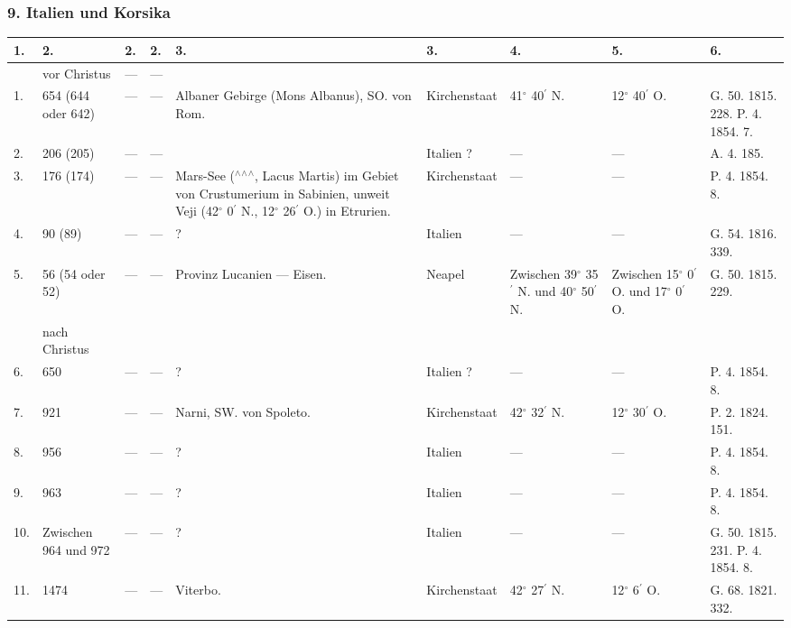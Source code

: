 \documentclass[a4paper, 8pt, oneside, polutonikogreek, german]{article}
\begin{document}
\subsubsection{9. Italien und Korsika}
\begin{center}
    \footnotesize
    \begin{longtable}{|p{3mm}|p{13mm}|p{5mm}|p{16mm}|p{25mm}|p{18mm}|p{13mm}|p{13mm}|p{13mm}|}
    \hline
        1. & 2. & 2. & 2. & 3. & 3. & 4. & 5. & 6. \\ \hline
          & vor Christus & --- & --- &   &   &   &   &   \\ \hline
        1. & 654 (644 oder 642) & --- & --- & Albaner Gebirge (Mons Albanus), SO. von Rom. & Kirchenstaat & 41$^\circ$ 40$^\prime$ N. & 12$^\circ$ 40$^\prime$ O. & G. 50. 1815. 228. P. 4. 1854. 7. \\ \hline
        2. & 206 (205) & --- & --- & ~ & Italien ? & --- & --- & A. 4. 185. \\ \hline
        3. & 176 (174) & --- & --- & Mars-See ($^\wedge$$^\wedge$$^\wedge$, Lacus Martis) im Gebiet von Crustumerium in Sabinien, unweit Veji (42$^\circ$ 0$^\prime$ N., 12$^\circ$ 26$^\prime$ O.) in Etrurien. & Kirchenstaat & --- & --- & P. 4. 1854. 8. \\ \hline
        4. & 90 (89) & --- & --- & ? & Italien & --- & --- & G. 54. 1816. 339. \\ \hline
        5. & 56 (54 oder 52) & --- & --- & Provinz Lucanien --- Eisen. & Neapel & Zwischen 39$^\circ$ 35$^\prime$ N. und 40$^\circ$ 50$^\prime$ N. & Zwischen 15$^\circ$ 0$^\prime$ O. und 17$^\circ$ 0$^\prime$ O. & G. 50. 1815. 229. \\ \hline
          & nach Christus &   &   &   &   &   &   &   \\ \hline
        6. & 650 & --- & --- & ? & Italien ? & --- & --- & P. 4. 1854. 8. \\ \hline
        7. & 921 & --- & --- & Narni, SW. von Spoleto. & Kirchenstaat & 42$^\circ$ 32$^\prime$ N. & 12$^\circ$ 30$^\prime$ O. & P. 2. 1824. 151. \\ \hline
        8. & 956 & --- & --- & ? & Italien & --- & --- & P. 4. 1854. 8. \\ \hline
        9. & 963 & --- & --- & ? & Italien & --- & --- & P. 4. 1854. 8. \\ \hline
        10. & Zwischen 964 und 972 & --- & --- & ? & Italien & --- & --- & G. 50. 1815. 231. P. 4. 1854. 8. \\ \hline
        11. & 1474 & --- & --- & Viterbo. & Kirchenstaat & 42$^\circ$ 27$^\prime$ N. & 12$^\circ$ 6$^\prime$ O. & G. 68. 1821. 332. \\ \hline

\end{longtable}
\end{center}
\end{document}

